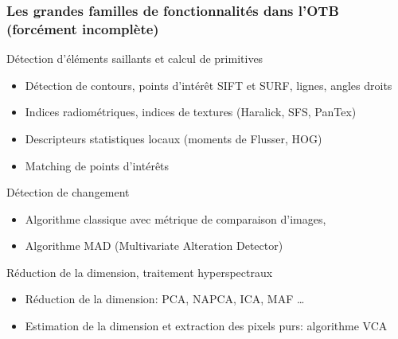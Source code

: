 \documentclass[8pt]{beamer}
\begin{document}
\begin{frame}
\frametitle{Les grandes familles de fonctionnalités dans l'OTB (forcément incomplète)}

\begin{block}{Détection d'éléments saillants et calcul de primitives}
\begin{itemize}
\item Détection de contours, points d'intérêt SIFT et SURF, lignes, angles droits
\item Indices radiométriques, indices de textures (Haralick, SFS, PanTex)
\item Descripteurs statistiques locaux (moments de Flusser, HOG)
\item Matching de points d'intérêts
\end{itemize}
\end{block}

\begin{block}{Détection de changement}
\begin{itemize}
\item Algorithme classique avec métrique de comparaison d'images,
\item Algorithme MAD (Multivariate Alteration Detector)
\end{itemize}
\end{block}

\begin{block}{Réduction de la dimension, traitement hyperspectraux}
\begin{itemize}
\item Réduction de la dimension: PCA, NAPCA, ICA, MAF \ldots
\item Estimation de la dimension et extraction des pixels purs: algorithme VCA
\end{itemize}
\end{block}

\end{frame}
\end{document}
